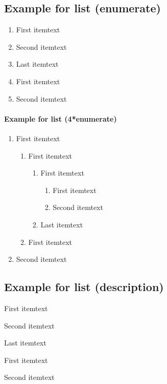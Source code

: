 \subsection{Example for list (enumerate)}

\begin{enumerate}
  \item First itemtext
  \item Second itemtext
  \item Last itemtext
  \item First itemtext
  \item Second itemtext
\end{enumerate}

\paragraph{Example for list (4*enumerate)}

\begin{enumerate}
  \item First itemtext
  \begin{enumerate}
    \item First itemtext
    \begin{enumerate}
      \item First itemtext
      \begin{enumerate}
        \item First itemtext
        \item Second itemtext
      \end{enumerate}
    \item Last itemtext
    \end{enumerate}
  \item First itemtext
  \end{enumerate}
  \item Second itemtext
\end{enumerate}

\subsection{Example for list (description)}

\begin{description}
  \item First itemtext
  \item Second itemtext
  \item Last itemtext
  \item First itemtext
  \item Second itemtext
\end{description}

